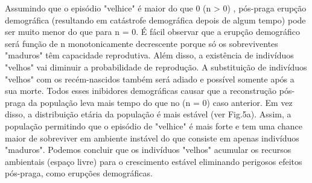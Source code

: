 \documentclass{article}
\begin{document}

Assumindo que o episódio "velhice" é maior do que 0 (n > 0) , pós-praga erupção demográfica (resultando em catástrofe demográfica depois de algum tempo) pode ser muito menor do que para n = 0. É fácil observar que a erupção demográfico será função de n monotonicamente decrescente porque só os sobreviventes "maduros" têm capacidade reprodutiva. Além disso, a existência de indivíduos "velhos" vai diminuir a probabilidade de reprodução. A substituição de indivíduos "velhos" com os recém-nascidos também será adiado e possível somente após a sua morte. Todos esses inibidores demográficas causar que a reconstrução pós-praga da população leva mais tempo do que no (n = 0) caso anterior. Em vez disso, a distribuição etária da população é mais estável (ver Fig.5a). Assim, a população permitindo que o episódio de "velhice" é mais forte e tem uma chance maior de sobreviver em ambiente instável do que consiste em apenas indivíduos "maduros". Podemos concluir que os indivíduos "velhos" acumular os recursos ambientais (espaço livre) para o crescimento estável eliminando perigosos efeitos pós-praga, como erupções demográficas.

\end{document}
